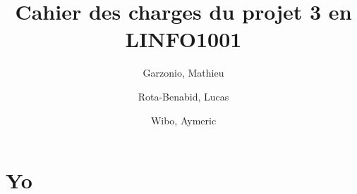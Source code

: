 \documentclass{article}
\title{Cahier des charges du projet 3 en LINFO1001}
\author{
	Garzonio, Mathieu
	\and
	Rota-Benabid, Lucas
	\and
	Wibo, Aymeric
}
\begin{document}
\maketitle

\section{Yo}
\end{document}
